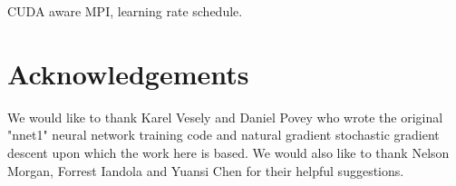 \documentclass{article}
\begin{document}
CUDA aware MPI, learning rate schedule.


\section{Acknowledgements}
We would like to thank Karel Vesely and Daniel Povey who wrote the original "nnet1" neural network training code
and natural gradient stochastic gradient descent upon which the work here is based. We would also like to thank Nelson 
Morgan, Forrest Iandola and Yuansi Chen for their helpful suggestions.



\end{document}
